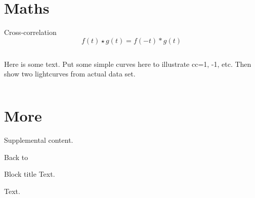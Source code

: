 \documentclass[9pt,table]{beamer}
\newcommand\Wider[2][3em]{%
    \makebox[\linewidth][c]{%
       \begin{minipage}{\dimexpr\textwidth+#1\relax}
           \raggedright#2
       \end{minipage}}}
\begin{document}
\section{Maths}
\begin{frame}[t, label=main]{Cross-correlation}
    \[
        f(t) \star g(t) = f(-t) \ast g(t)
        \]
    \begin{columns}[t]
        Here is some text.
        Put some simple curves here to illustrate cc=1, -1, etc.
        Then show two lightcurves from actual data set.
    \end{columns}
    \hyperlink{supplemental}{}
\end{frame}
\appendix
\section{More}
\begin{frame}[label=supplemental]
    Supplemental content.

    Back to \hyperlink{main}{}
\end{frame}
\begin{frame}
    \begin{block}{Block title}
        Text.
    \end{block}
    \begin{block}
        Text.
    \end{block}
\end{frame}

%
\end{document}
